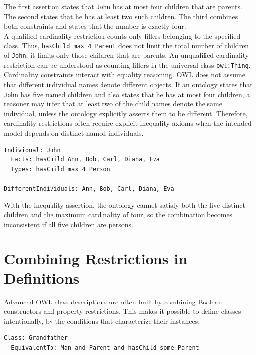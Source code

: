 \documentclass{scrbook}
\begin{document}
	The first assertion states that \texttt{John} has at most four children that are parents. The second states that he has at least two such children. The third combines both constraints and states that the number is exactly four.\\
	
	A qualified cardinality restriction counts only fillers belonging to the specified class. Thus, \texttt{hasChild max 4 Parent} does not limit the total number of children of \texttt{John}; it limits only those children that are parents. An unqualified cardinality restriction can be understood as counting fillers in the universal class \texttt{owl:Thing}.\\
	
	Cardinality constraints interact with equality reasoning. OWL does not assume that different individual names denote different objects. If an ontology states that \texttt{John} has five named children and also states that he has at most four children, a reasoner may infer that at least two of the child names denote the same individual, unless the ontology explicitly asserts them to be different. Therefore, cardinality restrictions often require explicit inequality axioms when the intended model depends on distinct named individuals.
	
	\begin{lstlisting}
Individual: John
  Facts: hasChild Ann, Bob, Carl, Diana, Eva
  Types: hasChild max 4 Person

DifferentIndividuals: Ann, Bob, Carl, Diana, Eva
	\end{lstlisting}
	
	With the inequality assertion, the ontology cannot satisfy both the five distinct children and the maximum cardinality of four, so the combination becomes inconsistent if all five children are persons.
	
	\section{Combining Restrictions in Definitions}
	
	Advanced OWL class descriptions are often built by combining Boolean constructors and property restrictions. This makes it possible to define classes intentionally, by the conditions that characterize their instances.
	
	\begin{lstlisting}
Class: Grandfather
  EquivalentTo: Man and Parent and hasChild some Parent
	\end{lstlisting}
	
\end{document}
